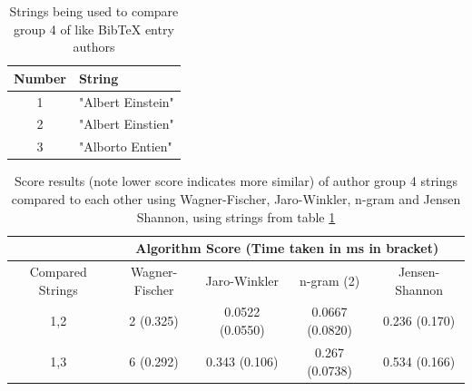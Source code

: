 \documentclass[a4paper,11pt]{article}
\begin{document}
\begin{table}[H]
      \centering
      \begin{tabular}{|c|p{}|}
      \hline
           Number &  String \\ \hline \hline
           1 & "Albert Einstein" \\ \hline
           2 & "Albert Einstien" \\ \hline
           3 & "Alborto Entien" \\ \hline
      \end{tabular}
  \caption{Strings being used to compare group 4 of like BibTeX entry authors}
\label{table:authorsGroup4Strings}
\end{table}
    \begin{table}[H]
    \centering
       \begin{tabular}{|c|c|c|c|c|}
    \hline
     & \multicolumn{4}{c|}{Algorithm Score (Time taken in ms in bracket)}\\
     \hline
     Compared Strings  & Wagner-Fischer & Jaro-Winkler & n-gram (2) & Jensen-Shannon \\
     \hline \hline
    1,2 & 2 (0.325) &
0.0522 (0.0550) &
0.0667 (0.0820) &
0.236 (0.170) \\
             \hline
    1,3 & 6 (0.292) &
0.343 (0.106) &
0.267 (0.0738) &
0.534 (0.166) \\
    \hline
    \end{tabular}
    \caption{Score results (note lower score indicates more similar) of author group 4 strings compared to each other using Wagner-Fischer, Jaro-Winkler, n-gram and Jensen Shannon, using strings from table \ref{table:authorsGroup4Strings}}
\label{table:algComparisonResultsAuthor4}
\end{table}
\end{document}
